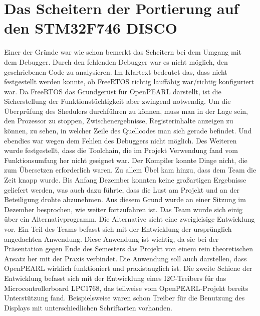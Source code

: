 \documentclass[12pt,a4paper]{article}
\author{Jonathan Weißenberger}
\begin{document}
\section{Das Scheitern der Portierung auf den STM32F746 DISCO}
Einer der Gründe war wie schon bemerkt das Scheitern bei dem Umgang mit dem Debugger. Durch den fehlenden Debugger war es nicht möglich, den geschriebenen Code zu analysieren. Im Klartext bedeutet das, dass nicht festgestellt werden konnte, ob FreeRTOS richtig lauffähig war/richtig konfiguriert war. Da FreeRTOS das Grundgerüst für OpenPEARL darstellt, ist die Sicherstellung der Funktionstüchtigkeit aber zwingend notwendig. Um die Überprüfung des Shedulers durchführen zu können, muss man in der Lage sein, den Prozessor zu stoppen, Zwischenergebnisse, Registerinhalte anzeigen zu können, zu sehen, in welcher Zeile des Quellcodes man sich gerade befindet. Und ebendies war wegen dem Fehlen des Debuggers nicht möglich. 
Des Weiteren wurde festgestellt, dass die Toolchain, die im Projekt Verwendung fand vom Funktionsumfang her nicht geeignet war. Der Kompiler konnte Dinge nicht, die zum Übersetzen erforderlich waren.
Zu allem Übel kam hinzu, dass dem Team die Zeit knapp wurde. Bis Anfang Dezember konnten keine großartigen Ergebnisse geliefert werden, was auch dazu führte, dass die Lust am Projekt und an der Beteiligung drohte abzunehmen. 
Aus diesem Grund wurde an einer Sitzung im Dezember besprochen, wie weiter fortzufahren ist. Das Team wurde sich einig über ein Alternativprogramm.
Die Alternative sieht eine zweigleisige Entwicklung vor. Ein Teil des Teams befasst sich mit der Entwicklung der ursprünglich angedachten Anwendung. Diese Anwendung ist wichtig, da sie bei der Präsentation gegen Ende des Semesters das Projekt von einem rein theoretischen Ansatz her mit der Praxis verbindet. Die Anwendung soll auch darstellen, dass OpenPEARL wirklich funktioniert und praxistauglich ist. Die zweite Schiene der Entwicklung befasst sich mit der Entwicklung eines I2C-Treibers für das Microcontrollerboard LPC1768, das teilweise vom OpenPEARL-Projekt bereits Unterstützung fand. Beispielsweise waren schon Treiber für die Benutzung des Displays mit unterschiedlichen Schriftarten vorhanden.
\end{document}
